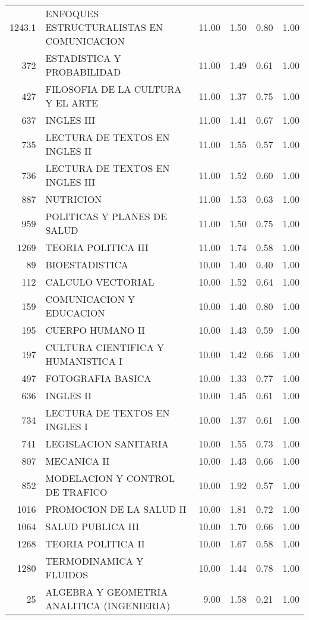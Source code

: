 \documentclass[12pt]{article}
\begin{document}
\begin{table}[ht]
\begin{tabular}{rlrrrr}
  1243.1 & ENFOQUES ESTRUCTURALISTAS EN COMUNICACION & 11.00 & 1.50 & 0.80 & 1.00 \\ 
  372 & ESTADISTICA Y PROBABILIDAD & 11.00 & 1.49 & 0.61 & 1.00 \\ 
  427 & FILOSOFIA DE LA CULTURA Y EL ARTE & 11.00 & 1.37 & 0.75 & 1.00 \\ 
  637 & INGLES III & 11.00 & 1.41 & 0.67 & 1.00 \\ 
  735 & LECTURA DE TEXTOS EN INGLES II & 11.00 & 1.55 & 0.57 & 1.00 \\ 
  736 & LECTURA DE TEXTOS EN INGLES III & 11.00 & 1.52 & 0.60 & 1.00 \\ 
  887 & NUTRICION & 11.00 & 1.53 & 0.63 & 1.00 \\ 
  959 & POLITICAS Y PLANES DE SALUD & 11.00 & 1.50 & 0.75 & 1.00 \\ 
  1269 & TEORIA POLITICA III & 11.00 & 1.74 & 0.58 & 1.00 \\ 
  89 & BIOESTADISTICA & 10.00 & 1.40 & 0.40 & 1.00 \\ 
  112 & CALCULO VECTORIAL & 10.00 & 1.52 & 0.64 & 1.00 \\ 
  159 & COMUNICACION Y EDUCACION & 10.00 & 1.40 & 0.80 & 1.00 \\ 
  195 & CUERPO HUMANO II & 10.00 & 1.43 & 0.59 & 1.00 \\ 
  197 & CULTURA CIENTIFICA Y HUMANISTICA I & 10.00 & 1.42 & 0.66 & 1.00 \\ 
  497 & FOTOGRAFIA BASICA & 10.00 & 1.33 & 0.77 & 1.00 \\ 
  636 & INGLES II & 10.00 & 1.45 & 0.61 & 1.00 \\ 
  734 & LECTURA DE TEXTOS EN INGLES I & 10.00 & 1.37 & 0.61 & 1.00 \\ 
  741 & LEGISLACION SANITARIA & 10.00 & 1.55 & 0.73 & 1.00 \\ 
  807 & MECANICA II & 10.00 & 1.43 & 0.66 & 1.00 \\ 
  852 & MODELACION Y CONTROL DE TRAFICO & 10.00 & 1.92 & 0.57 & 1.00 \\ 
  1016 & PROMOCION DE LA SALUD II & 10.00 & 1.81 & 0.72 & 1.00 \\ 
  1064 & SALUD PUBLICA III & 10.00 & 1.70 & 0.66 & 1.00 \\ 
  1268 & TEORIA POLITICA II & 10.00 & 1.67 & 0.58 & 1.00 \\ 
  1280 & TERMODINAMICA Y FLUIDOS & 10.00 & 1.44 & 0.78 & 1.00 \\ 
  25 & ALGEBRA Y GEOMETRIA ANALITICA (INGENIERIA) & 9.00 & 1.58 & 0.21 & 1.00 \\ 

\end{tabular}
\end{table}
\end{document}
